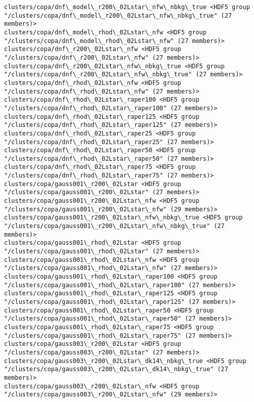 \documentclass[11pt]{article}
\begin{document}
\begin{Verbatim}[commandchars=\\\{\}]
clusters/copa/dnf\_model\_r200\_02Lstar\_nfw\_nbkg\_true <HDF5 group "/clusters/copa/dnf\_model\_r200\_02Lstar\_nfw\_nbkg\_true" (27 members)>
clusters/copa/dnf\_model\_rhod\_02Lstar\_nfw <HDF5 group "/clusters/copa/dnf\_model\_rhod\_02Lstar\_nfw" (27 members)>
clusters/copa/dnf\_r200\_02Lstar\_nfw <HDF5 group "/clusters/copa/dnf\_r200\_02Lstar\_nfw" (27 members)>
clusters/copa/dnf\_r200\_02Lstar\_nfw\_nbkg\_true <HDF5 group "/clusters/copa/dnf\_r200\_02Lstar\_nfw\_nbkg\_true" (27 members)>
clusters/copa/dnf\_rhod\_02Lstar\_nfw <HDF5 group "/clusters/copa/dnf\_rhod\_02Lstar\_nfw" (27 members)>
clusters/copa/dnf\_rhod\_02Lstar\_raper100 <HDF5 group "/clusters/copa/dnf\_rhod\_02Lstar\_raper100" (27 members)>
clusters/copa/dnf\_rhod\_02Lstar\_raper125 <HDF5 group "/clusters/copa/dnf\_rhod\_02Lstar\_raper125" (27 members)>
clusters/copa/dnf\_rhod\_02Lstar\_raper25 <HDF5 group "/clusters/copa/dnf\_rhod\_02Lstar\_raper25" (27 members)>
clusters/copa/dnf\_rhod\_02Lstar\_raper50 <HDF5 group "/clusters/copa/dnf\_rhod\_02Lstar\_raper50" (27 members)>
clusters/copa/dnf\_rhod\_02Lstar\_raper75 <HDF5 group "/clusters/copa/dnf\_rhod\_02Lstar\_raper75" (27 members)>
clusters/copa/gauss001\_r200\_02Lstar <HDF5 group "/clusters/copa/gauss001\_r200\_02Lstar" (27 members)>
clusters/copa/gauss001\_r200\_02Lstar\_nfw <HDF5 group "/clusters/copa/gauss001\_r200\_02Lstar\_nfw" (29 members)>
clusters/copa/gauss001\_r200\_02Lstar\_nfw\_nbkg\_true <HDF5 group "/clusters/copa/gauss001\_r200\_02Lstar\_nfw\_nbkg\_true" (27 members)>
clusters/copa/gauss001\_rhod\_02Lstar <HDF5 group "/clusters/copa/gauss001\_rhod\_02Lstar" (27 members)>
clusters/copa/gauss001\_rhod\_02Lstar\_nfw <HDF5 group "/clusters/copa/gauss001\_rhod\_02Lstar\_nfw" (27 members)>
clusters/copa/gauss001\_rhod\_02Lstar\_raper100 <HDF5 group "/clusters/copa/gauss001\_rhod\_02Lstar\_raper100" (27 members)>
clusters/copa/gauss001\_rhod\_02Lstar\_raper125 <HDF5 group "/clusters/copa/gauss001\_rhod\_02Lstar\_raper125" (27 members)>
clusters/copa/gauss001\_rhod\_02Lstar\_raper50 <HDF5 group "/clusters/copa/gauss001\_rhod\_02Lstar\_raper50" (27 members)>
clusters/copa/gauss001\_rhod\_02Lstar\_raper75 <HDF5 group "/clusters/copa/gauss001\_rhod\_02Lstar\_raper75" (27 members)>
clusters/copa/gauss003\_r200\_02Lstar <HDF5 group "/clusters/copa/gauss003\_r200\_02Lstar" (27 members)>
clusters/copa/gauss003\_r200\_02Lstar\_dk14\_nbkg\_true <HDF5 group "/clusters/copa/gauss003\_r200\_02Lstar\_dk14\_nbkg\_true" (27 members)>
clusters/copa/gauss003\_r200\_02Lstar\_nfw <HDF5 group "/clusters/copa/gauss003\_r200\_02Lstar\_nfw" (29 members)>

\end{Verbatim}
\end{document}
